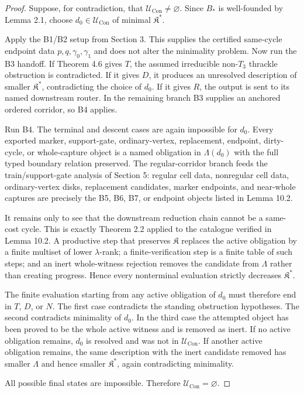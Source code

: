 \documentclass[11pt]{amsart}
\theoremstyle{definition}
\begin{document}
\begin{proof}
Suppose, for contradiction, that
\(\mathcal U_{\mathrm{Con}}\ne\varnothing\). Since \(B_\ast\) is well-founded by
Lemma 2.1, choose \(d_0\in\mathcal U_{\mathrm{Con}}\) of minimal
\(\mathfrak K^\ast\).

Apply the B1/B2 setup from Section 3. This supplies the certified same-cycle
endpoint data \(p,q,\gamma_0,\gamma_1\) and does not alter the minimality problem.
Now run the B3 handoff. If Theorem 4.6 gives \(T\), the assumed irreducible
non-\(T_3\) thrackle obstruction is contradicted. If it gives \(D\), it produces an
unresolved description of smaller \(\mathfrak K^\ast\), contradicting the choice
of \(d_0\). If it gives \(R\), the output is sent to its named downstream router. In
the remaining branch B3 supplies an anchored ordered corridor, so B4 applies.

Run B4. The terminal and descent cases are again impossible for \(d_0\). Every
exported marker, support-gate, ordinary-vertex, replacement, endpoint,
dirty-cycle, or whole-capture object is a named obligation in \(\Lambda(d_0)\) with
the full typed boundary relation preserved. The regular-corridor branch feeds
the train/support-gate analysis of Section 5: regular cell data, nonregular
cell data, ordinary-vertex disks, replacement candidates, marker endpoints, and
near-whole captures are precisely the B5, B6, B7, or endpoint objects listed in
Lemma 10.2.

It remains only to see that the downstream reduction chain cannot be a same-cost
cycle. This is exactly Theorem 2.2 applied to the catalogue verified in Lemma
10.2. A productive step that preserves \(\mathfrak K\) replaces the active
obligation by a finite multiset of lower \(\lambda\)-rank; a finite-verification
step is a finite table of such steps; and an inert whole-witness rejection removes the
candidate from \(\Lambda\) rather than creating progress. Hence every nonterminal
evaluation strictly decreases \(\mathfrak K^\ast\).

The finite evaluation starting from any active obligation of \(d_0\) must
therefore end in \(T\), \(D\), or \(N\). The first case contradicts the standing
obstruction hypotheses. The second contradicts minimality of \(d_0\). In the
third case the attempted object has been proved to be the whole active witness
and is removed as inert. If no active obligation remains, \(d_0\) is resolved and
was not in \(\mathcal U_{\mathrm{Con}}\). If another active obligation remains,
the same description with the inert candidate removed has smaller
\(\Lambda\) and hence smaller \(\mathfrak K^\ast\), again contradicting minimality.

All possible final states are impossible. Therefore
\(\mathcal U_{\mathrm{Con}}=\varnothing\).

\end{proof}
\end{document}
